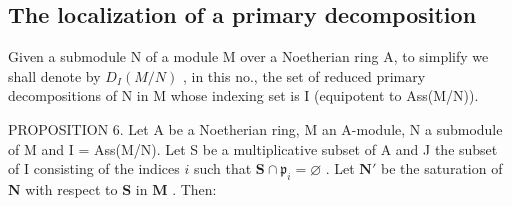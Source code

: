 \subsection{The localization of a primary decomposition}

Given a submodule N of a module M over a Noetherian ring A, to simplify we shall denote by \(D_{I}(M/N)\) , in this no., the set of reduced primary decompositions of N in M whose indexing set is I (equipotent to Ass(M/N)).

PROPOSITION 6. Let A be a Noetherian ring, M an A-module, N a submodule of M and I = Ass(M/N). Let S be a multiplicative subset of A and J the subset of I consisting of the indices \(i\) such that \(\mathbf{S} \cap \mathfrak{p}_i = \varnothing\) . Let \(\mathbf{N}'\) be the saturation of \(\mathbf{N}\) with respect to \(\mathbf{S}\) in \(\mathbf{M}\) . Then:

